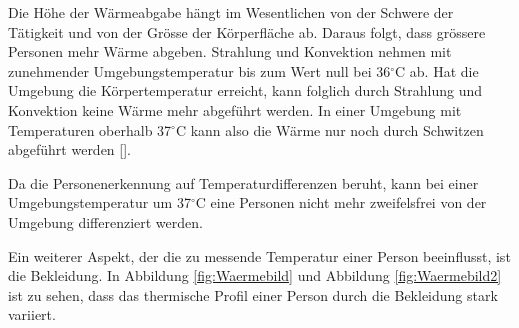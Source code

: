 Die Höhe der Wärmeabgabe hängt im Wesentlichen von der Schwere der Tätigkeit und von der Grösse der Körperfläche ab. Daraus folgt, dass grössere Personen mehr Wärme abgeben. Strahlung und Konvektion nehmen mit zunehmender Umgebungstemperatur bis zum Wert null bei 36$^\circ$C ab. Hat die Umgebung die Körpertemperatur erreicht, kann folglich durch Strahlung und Konvektion keine Wärme mehr abgeführt werden. In einer Umgebung mit Temperaturen oberhalb 37$^\circ$C kann also die Wärme nur noch durch Schwitzen abgeführt werden [\protect\cite{MenschWaerme}]. 

Da die Personenerkennung auf Temperaturdifferenzen beruht, kann bei einer Umgebungstemperatur um 37$^\circ$C eine Personen nicht mehr zweifelsfrei von der Umgebung differenziert werden. 

Ein weiterer Aspekt, der die zu messende Temperatur einer Person beeinflusst, ist die Bekleidung. In Abbildung \ref{fig:Waermebild} und Abbildung \ref{fig:Waermebild2} ist zu sehen, dass das thermische Profil einer Person durch die Bekleidung stark variiert.

